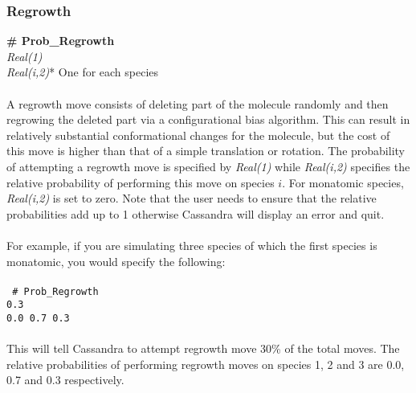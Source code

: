 \subsubsection{Regrowth}
{\bf \# Prob\_Regrowth} \\
{\it Real(1)} \\ 
{\it Real(i,2)}* One for each species \\ \\
%
A regrowth move consists of deleting part of the molecule randomly and
then regrowing the deleted part via a configurational bias algorithm.
This can result in relatively substantial conformational changes for
the molecule, but the cost of this move is higher than that of a
simple translation or rotation. The probability of attempting a
regrowth move is specified by {\it Real(1)} while {\it Real(i,2)}
specifies the relative probability of performing this move on species
$i$. For monatomic species, {\it Real(i,2)} is set to zero. Note that
the user needs to ensure that the relative probabilities add 
up to 1 otherwise Cassandra will display an error and quit. \\ \\
% 
For example, if you are simulating three species of which the first
species is monatomic, you would specify the following: \\ \\ 
%
\texttt{
\# Prob\_Regrowth \\
0.3 \\
0.0 0.7 0.3 } \\ \\
%
This will tell Cassandra to attempt regrowth move 30\% of the total moves. The relative probabilities of
performing regrowth moves on species 1, 2 and 3 are 0.0, 0.7 and 0.3 respectively. 
%
%
